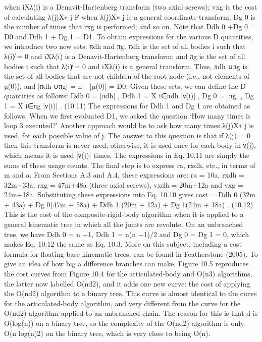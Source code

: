 when iXλ(i) is a Denavit-Hartenberg transform (two axial screws); vxg is the cost of calculating λ(j)X∗ j F when λ(j)X∗ j is a general coordinate transform; Dg 0 is the number of times that rxg is performed; and so on. Note that Ddh 0 +Dg 0 = D0 and Ddh 1 + Dg 1 = D1. To obtain expressions for the various D quantities, we introduce two new sets: πdh and πg. πdh is the set of all bodies i such that λ(i)̸ = 0 and iXλ(i) is a Denavit-Hartenberg transform; and πg is the set of all bodies i such that λ(i)̸ = 0 and iXλ(i) is a general transform. Thus, πdh ∪πg is the set of all bodies that are not children of the root node (i.e., not elements of µ(0)), and |πdh ∪πg| = n −|µ(0)| = D0. Given these sets, we can define the D quantities as follows: Ddh 0 = |πdh| , Ddh 1 = X i∈πdh |ν(i)| , Dg 0 = |πg| , Dg 1 = X i∈πg |ν(i)| . (10.11) The expressions for Ddh 1 and Dg 1 are obtained as follows. When we first evaluated D1, we asked the question ‘How many times is loop 3 executed?’ Another approach would be to ask how many times λ(j)X∗ j is used, for each possible value of j. The answer to this question is that if λ(j) = 0 then this transform is never used; otherwise, it is used once for each body in ν(j), which means it is used |ν(j)| times. The expressions in Eq. 10.11 are simply the sums of these usage counts. The final step is to express ra, rxdh, etc., in terms of m and a. From Sections A.3 and A.4, these expressions are: ra = 10a, rxdh = 32m+33a, rxg = 47m+48a (three axial screws), vxdh = 20m+12a and vxg = 24m+18a. Substituting these expressions into Eq. 10.10 gives cost = Ddh 0 (32m + 43a) + Dg 0(47m + 58a) + Ddh 1 (20m + 12a) + Dg 1(24m + 18a) . (10.12) This is the cost of the composite-rigid-body algorithm when it is applied to a general kinematic tree in which all the joints are revolute. On an unbranched tree, we have Ddh 0 = n −1, Ddh 1 = n(n −1)/2 and Dg 0 = Dg 1 = 0, which makes Eq. 10.12 the same as Eq. 10.3. More on this subject, including a cost formula for floating-base kinematic trees, can be found in Featherstone (2005). To give an idea of how big a difference branches can make, Figure 10.5 reproduces the cost curves from Figure 10.4 for the articulated-body and O(n3) algorithms, the latter now labelled O(nd2), and it adds one new curve: the cost of applying the O(nd2) algorithm to a binary tree. This curve is almost identical to the curve for the articulated-body algorithm, and very different from the curve for the O(nd2) algorithm applied to an unbranched chain. The reason for this is that d is O(log(n)) on a binary tree, so the complexity of the O(nd2) algorithm is only O(n log(n)2) on the binary tree, which is very close to being O(n).

